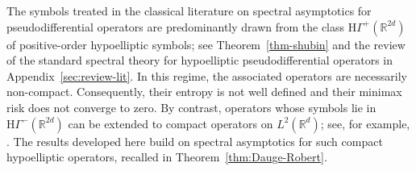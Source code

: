 \documentclass[a4paper,12pt]{article}
\let\originalleft\left
\let\originalright\right
\renewcommand{\left}{\mathopen{}\mathclose\bgroup\originalleft}
\renewcommand{\right}{\aftergroup\egroup\originalright}
\newcommand{\R}{\mathbb{R}}
\newcommand{\hyposymbclass}{\text{H}\Gamma^{m_-,m_+}_\rho}
\newcommand{\hyponegclass}{\mathrm{H}\Gamma^-}
\newcommand{\hypoposclass}{\mathrm{H}\Gamma^+}
\begin{document}
The symbols treated in the classical literature on spectral asymptotics for
pseudo\-differential operators are predominantly drawn from the class
$\hypoposclass(\R^{2d})$ of positive-order hypoelliptic symbols;
see Theorem~\ref{thm-shubin} and the review of the standard spectral theory for
hypoelliptic pseudodifferential operators in
Appendix~\ref{sec:review-lit}. In this regime, the associated operators are necessarily
non-compact. Consequently, their entropy is not well defined and their minimax
risk does not converge to zero. 
By contrast, operators whose symbols lie in $\hyponegclass(\R^{2d})$
can be extended to compact operators on $L^2(\R^d)$; %
see, for example, \cite[Theorem~24.4]{shubin_pseudodifferential_2001}.
The results developed here build on spectral asymptotics for such compact
hypoelliptic operators, recalled in Theorem~\ref{thm:Dauge-Robert}.
\end{document}
